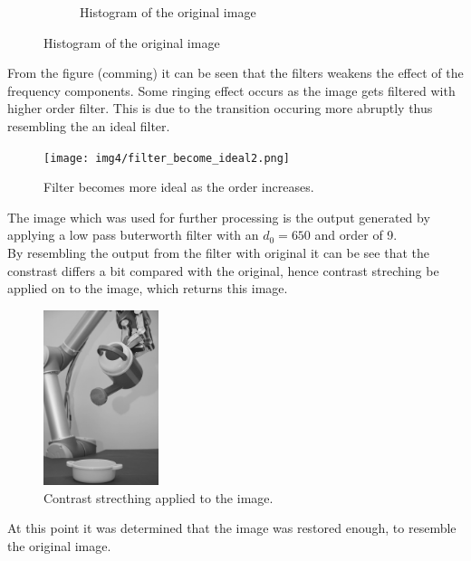 \begin{figure}[H]
\begin{subfigure}[b]{0.16\textwidth}
        \caption{Histogram of the original image}
        \label{fig:img2_hist}
    \end{subfigure}
\end{figure}


From the figure (comming) it can be seen that the filters weakens the effect of the frequency components. Some ringing effect occurs as the image gets filtered with higher order filter. This is due to the transition occuring more abruptly thus resembling the an ideal filter. 

\begin{figure}[H]
	\centering
	\texttt{[image: img4/filter\_become\_ideal2.png]}
	\caption{Filter becomes more ideal as the order increases.}
    \label{fig:filter_become_ideal}
\end{figure}


The image which was used for further processing is the output generated by applying a low pass buterworth filter with an $d_0 = 650$ and order of 9. \\
 
 By resembling the output from the filter with original it can be see that the constrast differs a bit compared with the original,  hence contrast streching be applied on to the image, which returns this image. 
 
 \begin{figure}[H]
 \centering
 \includegraphics[width=0.3\textwidth]{img4/filteredOutput_6509_contrast_strech.png}
 	\caption{Contrast strecthing applied to the image. }
    \label{fig:filter_become_ideal}
\end{figure} 

At this point it was determined that the image was restored enough, to resemble the original image. 

